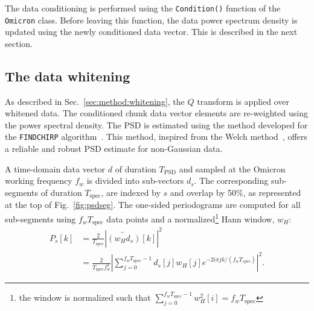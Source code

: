 The data conditioning is performed using the \texttt{Condition()} function of the \texttt{Omicron} class. Before leaving this function, the data power spectrum density is updated using the newly conditioned data vector. This is described in the next section. 


\subsection{The data whitening} \label{sec:algorithm:whitening}

As described in Sec.~\ref{sec:method:whitening}, the $Q$ transform is applied over whitened data. The conditioned chunk data vector elements are re-weighted using the power spectral density. The PSD is estimated using the method developed for the \texttt{FINDCHIRP} algorithm~\cite{Allen:2005fk}. This method, inspired from the Welch method~\cite{Welch:1967}, offers a reliable and robust PSD estimate for non-Gaussian data.

A time-domain data vector $d$ of duration $T_\mathrm{PSD}$ and sampled at the Omicron working frequency $f_w$ is divided into sub-vectors $d_s$. The corresponding sub-segments of duration $T_\mathrm{spec}$, are indexed by $s$ and overlap by 50\%, as represented at the top of Fig.~\ref{fig:psdseg}. The one-sided periodograms are computed for all sub-segments using $f_wT_\mathrm{spec}$ data points and a normalized\footnote{the window is normalized such that $\sum_{j=0}^{f_wT_\mathrm{spec}-1}{w_H^2[i]} = f_wT_\mathrm{spec}$} Hann window, $w_H$:
\begin{align}
  P_s[k] &= \frac{2}{T_\mathrm{spec}}\left|\widetilde{(w_Hd_s)}[k]\right|^2 \\
  &= \frac{2}{T_\mathrm{spec}f_w^2}\left|\sum_{j=0}^{f_wT_\mathrm{spec}-1}{d_s[j]w_H[j]e^{-2i\pi jk/(f_wT_{spec})}}\right|^2.
\end{align}


